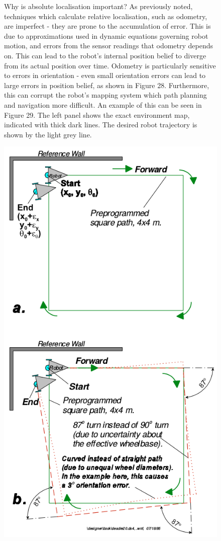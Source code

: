 \documentclass[a4paper]{article}
\begin{document}
\begin{figure}[h]
\begin{minipage}{0.45\textwidth}
Why is absolute localisation important? As previously noted, techniques which calculate relative localisation, such as odometry, are imperfect - they are prone to the accumulation of error. This is due to approximations used in dynamic equations governing robot motion, and errors from the sensor readings that odometry depends on. This can lead to the robot's internal position belief to diverge from its actual position over time. Odometry is particularly sensitive to errors in orientation - even small orientation errors can lead to large errors in position belief, as shown in Figure 28. Furthermore, this can corrupt the robot's mapping system which path planning and navigation more difficult. An example of this can be seen in Figure 29. The left panel shows the exact environment map, indicated with thick dark lines. The desired robot trajectory is shown by the light grey line. 
\end{minipage}
\hspace{1cm}
\begin{minipage}{0.45\textwidth}
\centering
\includegraphics[scale=0.4]{odom_error}

\end{minipage}
\end{figure}
\end{document}
